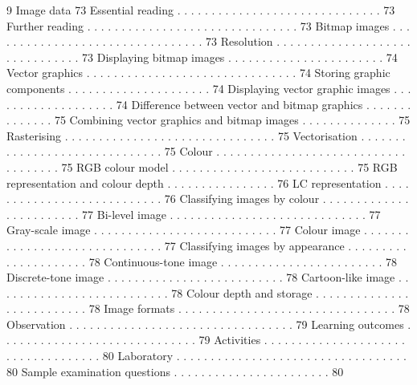 9 Image data 73
Essential reading . . . . . . . . . . . . . . . . . . . . . . . . . . . . . . 73
Further reading . . . . . . . . . . . . . . . . . . . . . . . . . . . . . . . 73
Bitmap images . . . . . . . . . . . . . . . . . . . . . . . . . . . . . . . . 73
Resolution . . . . . . . . . . . . . . . . . . . . . . . . . . . . . . . 73
Displaying bitmap images . . . . . . . . . . . . . . . . . . . . . . . 74
Vector graphics . . . . . . . . . . . . . . . . . . . . . . . . . . . . . . . 74
Storing graphic components . . . . . . . . . . . . . . . . . . . . . 74
Displaying vector graphic images . . . . . . . . . . . . . . . . . . . 74
Difference between vector and bitmap graphics . . . . . . . . . . . . . . 75
Combining vector graphics and bitmap images . . . . . . . . . . . . . . 75
Rasterising . . . . . . . . . . . . . . . . . . . . . . . . . . . . . . . 75
Vectorisation . . . . . . . . . . . . . . . . . . . . . . . . . . . . . . 75
Colour . . . . . . . . . . . . . . . . . . . . . . . . . . . . . . . . . . . . 75
RGB colour model . . . . . . . . . . . . . . . . . . . . . . . . . . . 75
RGB representation and colour depth . . . . . . . . . . . . . . . . 76
LC representation . . . . . . . . . . . . . . . . . . . . . . . . . . . 76
Classifying images by colour . . . . . . . . . . . . . . . . . . . . . . . . 77
Bi-level image . . . . . . . . . . . . . . . . . . . . . . . . . . . . . 77
Gray-scale image . . . . . . . . . . . . . . . . . . . . . . . . . . . 77
Colour image . . . . . . . . . . . . . . . . . . . . . . . . . . . . . . 77
Classifying images by appearance . . . . . . . . . . . . . . . . . . . . . 78
Continuous-tone image . . . . . . . . . . . . . . . . . . . . . . . . 78
Discrete-tone image . . . . . . . . . . . . . . . . . . . . . . . . . . 78
Cartoon-like image . . . . . . . . . . . . . . . . . . . . . . . . . . 78
Colour depth and storage . . . . . . . . . . . . . . . . . . . . . . . . . . 78
Image formats . . . . . . . . . . . . . . . . . . . . . . . . . . . . . . . . 78
Observation . . . . . . . . . . . . . . . . . . . . . . . . . . . . . . . . . 79
Learning outcomes . . . . . . . . . . . . . . . . . . . . . . . . . . . . . 79
Activities . . . . . . . . . . . . . . . . . . . . . . . . . . . . . . . . . . . 80
Laboratory . . . . . . . . . . . . . . . . . . . . . . . . . . . . . . . . . . 80
Sample examination questions . . . . . . . . . . . . . . . . . . . . . . . 80
